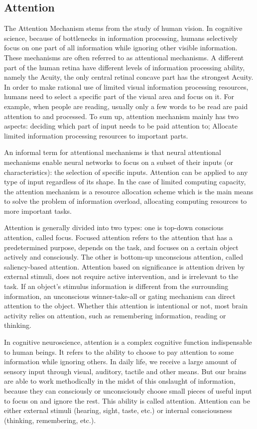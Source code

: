 \documentclass[conference]{IEEEtran}
\begin{document}
\subsection{Attention}
The Attention Mechanism stems from the study of human vision. In cognitive science, because of bottlenecks in information processing, humans selectively focus on one part of all information while ignoring other visible information. These mechanisms are often referred to as attentional mechanisms. A different part of the human retina have different levels of information processing ability, namely the Acuity, the only central retinal concave part has the strongest Acuity. In order to make rational use of limited visual information processing resources, humans need to select a specific part of the visual area and focus on it. For example, when people are reading, usually only a few words to be read are paid attention to and processed. To sum up, attention mechanism mainly has two aspects: deciding which part of input needs to be paid attention to; Allocate limited information processing resources to important parts.

An informal term for attentional mechanisms is that neural attentional mechanisms enable neural networks to focus on a subset of their inputs (or characteristics): the selection of specific inputs. Attention can be applied to any type of input regardless of its shape. In the case of limited computing capacity, the attention mechanism is a resource allocation scheme which is the main means to solve the problem of information overload, allocating computing resources to more important tasks.

Attention is generally divided into two types: one is top-down conscious attention, called focus. Focused attention refers to the attention that has a predetermined purpose, depends on the task, and focuses on a certain object actively and consciously. The other is bottom-up unconscious attention, called saliency-based attention. Attention based on significance is attention driven by external stimuli, does not require active intervention, and is irrelevant to the task. If an object's stimulus information is different from the surrounding information, an unconscious winner-take-all or gating mechanism can direct attention to the object. Whether this attention is intentional or not, most brain activity relies on attention, such as remembering information, reading or thinking.

In cognitive neuroscience, attention is a complex cognitive function indispensable to human beings. It refers to the ability to choose to pay attention to some information while ignoring others. In daily life, we receive a large amount of sensory input through visual, auditory, tactile and other means. But our brains are able to work methodically in the midst of this onslaught of information, because they can consciously or unconsciously choose small pieces of useful input to focus on and ignore the rest. This ability is called attention. Attention can be either external stimuli (hearing, sight, taste, etc.) or internal consciousness (thinking, remembering, etc.).
\end{document}
